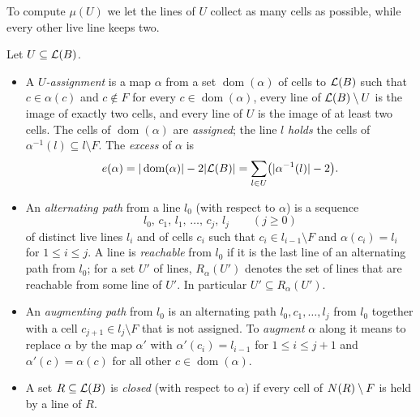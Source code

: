 To compute $\mu(U)$ we let the lines of $U$ collect as many cells as possible, while every other live
line keeps two.

\begin{definition}\label{def:U-assignment}
Let $U\subseteq\mathcal{L}(B)$.
\begin{itemize}
\item A \emph{$U$-assignment} is a map $\alpha$ from a set $\operatorname{dom}(\alpha)$ of cells to
      $\mathcal{L}(B)$ such that $c\in\alpha(c)$ and $c\notin F$ for every $c\in\operatorname{dom}(\alpha)$, every
      line of $\mathcal{L}(B)\setminus U$ is the image of exactly two cells, and every line of $U$ is the image
      of at least two cells. The cells of $\operatorname{dom}(\alpha)$ are \emph{assigned}; the line $l$
      \emph{holds} the cells of $\alpha^{-1}(l)\subseteq l\setminus F$. The \emph{excess} of $\alpha$ is
      \[
        e(\alpha)=|\operatorname{dom}(\alpha)|-2|\mathcal{L}(B)|=\sum_{l\in U}\bigl(|\alpha^{-1}(l)|-2\bigr).
      \]
\item An \emph{alternating path} from a line $l_0$ (with respect to $\alpha$) is a sequence
      \[ l_0,\,c_1,\,l_1,\,\dots,\,c_j,\,l_j\qquad(j\ge 0) \]
      of distinct live lines $l_i$ and of cells $c_i$ such that
      $c_i\in l_{i-1}\setminus F$ and $\alpha(c_i)=l_i$ for $1\le i\le j$. A line is \emph{reachable} from
      $l_0$ if it is the last line of an alternating path from $l_0$; for a set $U'$ of lines,
      $R_\alpha(U')$ denotes the set of lines that are reachable from some line of $U'$. In particular
      $U'\subseteq R_\alpha(U')$.
\item An \emph{augmenting path} from $l_0$ is an alternating path $l_0,c_1,\dots,l_j$ from $l_0$ together
      with a cell $c_{j+1}\in l_j\setminus F$ that is not assigned. To \emph{augment} $\alpha$ along it
      means to replace $\alpha$ by the map $\alpha'$ with $\alpha'(c_i)=l_{i-1}$ for $1\le i\le j+1$ and
      $\alpha'(c)=\alpha(c)$ for all other $c\in\operatorname{dom}(\alpha)$.
\item A set $R\subseteq\mathcal{L}(B)$ is \emph{closed} (with respect to $\alpha$) if every cell of
      $N(R)\setminus F$ is held by a line of $R$.
\end{itemize}
\end{definition}

